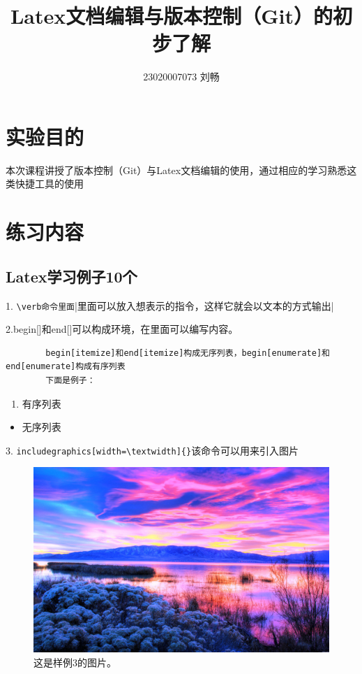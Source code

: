 \documentclass{article}
\title{Latex文档编辑与版本控制（Git）的初步了解}
\author{23020007073  刘畅}
\begin{document}
	
	\maketitle
	
	\section{实验目的}
	本次课程讲授了版本控制（Git）与Latex文档编辑的使用，通过相应的学习熟悉这类快捷工具的使用
	
	\section{练习内容}
	\subsection{Latex学习例子10个}
	1. \verb|\verb命令里面||里面可以放入想表示的指令，这样它就会以文本的方式输出|
	
	2.begin[]和end[]可以构成环境，在里面可以编写内容。
	\begin{verbatim}
		begin[itemize]和end[itemize]构成无序列表，begin[enumerate]和end[enumerate]构成有序列表
		下面是例子：
	\end{verbatim}
	
		\begin{enumerate}
		\item 有序列表
	\end{enumerate}%
	
	\begin{itemize}
		\item 无序列表
	\end{itemize}%
	
	3. \verb|includegraphics[width=\textwidth]{}|该命令可以用来引入图片
	\begin{figure}
		\centering %
		\includegraphics[width=\textwidth]{"tupian.jpg"}
		\caption{这是样例3的图片。} %
		\label{fig:example} %
	\end{figure}
	
\end{document}

